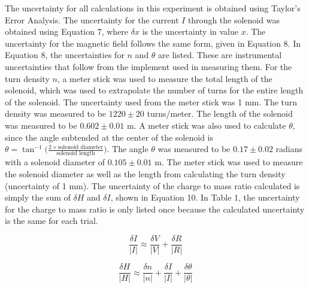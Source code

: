 \documentclass[%
 aip,
 amsmath,amssymb,
 reprint,%
floatfix,
]{revtex4-1}
\begin{document}
The uncertainty for all calculations in this experiment is obtained using Taylor's Error Analysis\cite{Taylor1996}. The uncertainty for the current $I$ through the solenoid was obtained using Equation 7, where $\delta x$ is the uncertainty in value $x$. The uncertainty for the magnetic field follows the same form, given in Equation 8. In Equation 8, the uncertainties for $n$ and $\theta$ are listed. These are instrumental uncertainties that follow from the implement used in measuring them. For the turn density $n$, a meter stick was used to measure the total length of the solenoid, which was used to extrapolate the number of turns for the entire length of the solenoid. The uncertainty used from the meter stick was 1 mm. The turn density was measured to be $1220 \pm 20$ turns/meter. The length of the solenoid was measured to be $0.602 \pm 0.01$ m. A meter stick was also used to calculate $\theta$, since the angle subtended at the center of the solenoid is $\theta = \tan^{-1}\big({\frac{2 \times \text{solenoid diameter}}{\text{solenoid length}}}\big)$. The angle $\theta$ was measured to be $0.17 \pm 0.02$ radians with a solenoid diameter of $0.105 \pm 0.01$ m. The meter stick was used to measure the solenoid diameter as well as the length from calculating the turn density (uncertainty of 1 mm). The uncertainty of the charge to mass ratio calculated is simply the sum of $\delta H$ and $\delta I$, shown in Equation 10. In Table 1, the uncertainty for the charge to mass ratio is only listed once because the calculated uncertainty is the same for each trial.


\begin{equation}
	\frac{\delta I}{\lvert I \rvert} \approx \frac{\delta V}{\lvert V \rvert} + \frac{\delta R}{\lvert R \rvert}
\end{equation}

\begin{equation}
	\frac{\delta H}{\lvert H \rvert} \approx \frac{\delta n}{\lvert n \rvert} + \frac{\delta I}{\lvert I \rvert} + \frac{\delta \theta}{\lvert \theta \rvert}
\end{equation}
\end{document}
